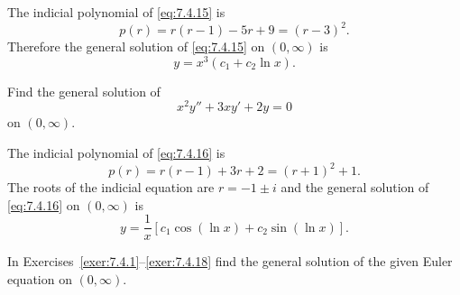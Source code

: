 \begin{examplesolution}
\solution The indicial polynomial of \eqref{eq:7.4.15} is
\[
  p(r)=r(r-1)-5r+9=(r-3)^{2}.
\]
Therefore the general solution of \eqref{eq:7.4.15} on $(0,\infty)$ is
\[
  y=x^{3}(c_{1}+c_{2}\ln x).
\]
\end{examplesolution}

\begin{example}
  \label{example:7.4.7} \rm Find the general solution of
  \begin{equation}
    \label{eq:7.4.16}x^{2}y''+3xy'+2y=0
  \end{equation}
  on $(0,\infty)$.
\end{example}

\begin{examplesolution}
\solution The indicial polynomial of \eqref{eq:7.4.16} is
\[
  p(r)=r(r-1)+3r+2=(r+1)^{2}+1.
\]
The roots of the indicial equation are $r=-1\pm i$ and the general solution of \eqref{eq:7.4.16} on
$(0,\infty)$ is
\[
  y=\frac{1}{x}\left[c_{1}\cos(\ln x)+c_{2}\sin(\ln x)\right].
\]
\end{examplesolution}

\exercises In Exercises~\ref{exer:7.4.1}--\ref{exer:7.4.18} find the general solution of the given Euler equation on $(0,\infty)$.

